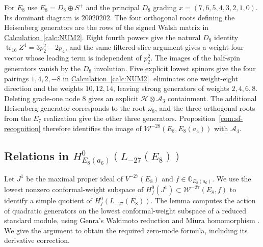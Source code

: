 \documentclass[11pt,a4paper]{amsart}
\numberwithin{equation}{section}
\theoremstyle{definition}
\theoremstyle{remark}
\newcommand{\OO}{\mathbb O}
\newcommand{\tr}{\operatorname{tr}}
\begin{document}
For $E_8$ use $E_8=D_8\oplus S^+$ and the principal $D_8$ grading
$x=(7,6,5,4,3,2,1,0)$. Its dominant diagram is $20020202$.
The four orthogonal roots defining the Heisenberg generators are the rows of the signed Walsh matrix
in \hyperref[calc:NUM2]{Calculation~\ref*{calc:NUM2}}. Eight fourth powers give the natural $D_8$ identity
$\tr_{16}Z^4=3p_2^2-2p_4$, and the same filtered slice argument
gives a weight-four vector whose leading term is independent of $p_2^2$.
The images of the half-spin generators vanish by the $D_8$ involution. Five explicit lowest spinors give the four
pairings $1,4,2,-8$ in \hyperref[calc:NUM2]{Calculation~\ref*{calc:NUM2}}.
 eliminates one
weight-eight direction and the weights $10,12,14$, leaving strong generators of weights $2,4,6,8$. Deleting grade-one node $8$ gives an explicit
$\mathcal H\otimes \mathcal A_3$ containment. The additional Heisenberg generator corresponds to the root $\omega_8$, and
the three orthogonal roots from the $E_7$ realization give the other
three generators. Proposition~\ref{com:sf-recognition} therefore identifies
the image of $\mathcal W^{-28}(E_8,E_8(a_4))$ with $\mathcal A_4$.

\subsection{\texorpdfstring{Relations in $H^0_{E_8(a_6)}(L_{-27}(E_8))$}{Relations in the E8(a6) reduction of L-27(E8)}}
Let $J^1$ be the maximal proper ideal of $V^{-27}(E_8)$ and
$f\in\OO_{E_8(a_6)}$. We use the lowest nonzero conformal-weight
subspace of $H_f^0(J^1)\subset\mathcal W^{-27}(E_8,f)$ to identify a
simple quotient of $H_f^0(L_{-27}(E_8))$.
The lemma computes the action of quadratic generators on the lowest
conformal-weight subspace of a reduced standard module, using Genra's
Wakimoto reduction and Miura homomorphism
\cite[Lemma~3.1, Proposition~4.5 and Corollary~4.6]{Genra}.
We give the argument to obtain the required zero-mode formula,
including its derivative correction.
\end{document}
